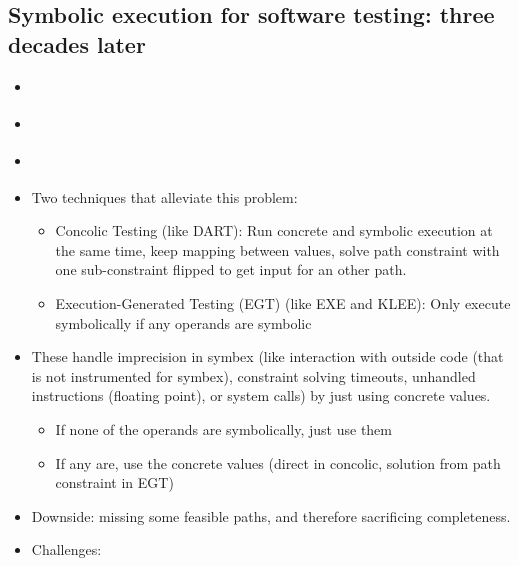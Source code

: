 \documentclass{article}
\begin{document}
\subsection{Symbolic execution for software testing: three decades later}
\begin{itemize}
  \item \cite{ReviewThreeDecades}
  \item {}\cite{ReviewThreeDecades}
  \item {}\cite{ReviewThreeDecades}
  \item Two techniques that alleviate this problem:
        \begin{itemize}
          \item Concolic Testing (like DART\cite{DART}): Run concrete and symbolic execution at the same time, keep mapping between values, solve path constraint with one sub-constraint flipped to get input for an other path.
          \item Execution-Generated Testing (EGT) (like EXE\cite{EXE} and KLEE\cite{KLEE}): Only execute symbolically if any operands are symbolic
        \end{itemize}
  \item These handle imprecision in symbex (like interaction with outside code (that is not instrumented for symbex), constraint solving timeouts, unhandled instructions (floating point), or system calls) by just using concrete values.
        \begin{itemize}
          \item If none of the operands are symbolically, just use them
          \item If any are, use the concrete values (direct in concolic, solution from path constraint in EGT)
        \end{itemize}
  \item Downside: missing some feasible paths, and therefore sacrificing completeness.
  \item Challenges:
        \begin{itemize}

\end{itemize}
\end{itemize}
\end{document}
